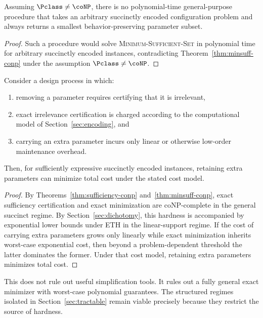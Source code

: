 \begin{corollary}
\label{cor:no-general-minimizer}
Assuming $\Pclass \neq \coNP$, there is no polynomial-time general-purpose procedure that takes an arbitrary succinctly encoded configuration problem and always returns a smallest behavior-preserving parameter subset.
\end{corollary}


\begin{proof}
Such a procedure would solve \textsc{Minimum-Sufficient-Set} in polynomial time for arbitrary succinctly encoded instances, contradicting Theorem~\ref{thm:minsuff-conp} under the assumption $\Pclass \neq \coNP$.
\end{proof}

\begin{proposition}
\label{prop:rational-overspecification}
Consider a design process in which:
\begin{enumerate}
\item removing a parameter requires certifying that it is irrelevant,
\item exact irrelevance certification is charged according to the computational model of Section~\ref{sec:encoding}, and
\item carrying an extra parameter incurs only linear or otherwise low-order maintenance overhead.
\end{enumerate}
Then, for sufficiently expressive succinctly encoded instances, retaining extra parameters can minimize total cost under the stated cost model.
\end{proposition}


\begin{proof}
By Theorems~\ref{thm:sufficiency-conp} and~\ref{thm:minsuff-conp}, exact sufficiency certification and exact minimization are coNP-complete in the general succinct regime. By Section~\ref{sec:dichotomy}, this hardness is accompanied by exponential lower bounds under ETH in the linear-support regime. If the cost of carrying extra parameters grows only linearly while exact minimization inherits worst-case exponential cost, then beyond a problem-dependent threshold the latter dominates the former. Under that cost model, retaining extra parameters minimizes total cost.
\end{proof}

\begin{remark}
This does not rule out useful simplification tools. It rules out a fully general exact minimizer with worst-case polynomial guarantees. The structured regimes isolated in Section~\ref{sec:tractable} remain viable precisely because they restrict the source of hardness.
\end{remark}

